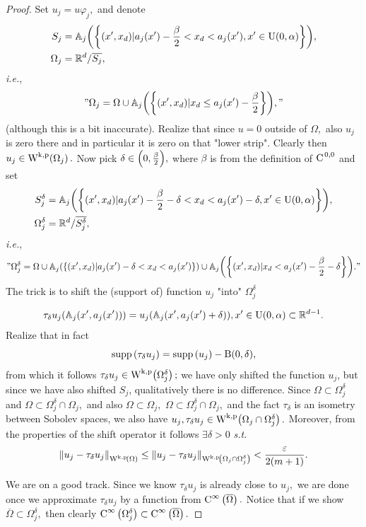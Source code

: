 \documentclass{article}
\begin{document}
\begin{proof}
	Set $u_j = u \varphi_j,$ and denote
	\begin{align*}
		S_j &=\mathbb{A}_j\qty(\qty{(x',x_d) | a_j(x') - \frac{\beta}{2}  < x_d < a_j(x') , x' \in \text{U}(0,\alpha)}), \\
	\Omega_j &= {\mathbb R}^{d} / \overline{S_j},
	\end{align*}
	\textit{i.e.},
	\[
		"\Omega_j = \Omega \cup \mathbb{A}_j\qty(\qty{(x',x_d)| x_d \leq a_j(x')- \frac{\beta}{2}}),"
	\]
	(although this is a bit inaccurate). Realize that since $u = 0$ outside of $\Omega,$ also $u_j$ is zero there and in particular it is zero on that "lower strip". Clearly then $u_j \in \WkpSet{\Omega_j}.$ Now pick $\delta \in \qty(0,\frac{\beta}{2}),$ where $\beta$ is from the definition of $\text{C}^{\!\,\, 0,0}$ and set
	\begin{align*}
	  		S_{j}^{\delta} &= \mathbb{A}_j\qty(\qty{(x',x_d) | a_j(x') - \frac{\beta}{2} - \delta < x_d < a_j(x') -\delta, x' \in \text{U}(0,\alpha)}), \\
		\Omega_j^{\delta} &= {\mathbb R}^{d} / \overline{S_{j}^{\delta}}, 
	\end{align*}
	\textit{i.e.},
	\[
		"\Omega_j^\delta = \Omega \cup \mathbb{A}_j\qty(\qty{(x',x_d)| a_j(x')-\delta < x_d < a_j (x')}) \cup \mathbb{A}_j \qty(\qty{(x',x_d)| x_d < a_j(x') - \frac{\beta}{2} - \delta})."
	\]
The trick is to shift the (support of) function $u_j$ "into" $\Omega_{j}^\delta$

	\[
		\tau_{\delta}u_j\qty(\mathbb{A}_j\qty(x', a_j(x'))) = u_j\qty(\mathbb{A}_j\qty(x', a_j(x') + \delta)), x' \in \text{U}(0,\alpha) \subset {\mathbb R}^{d-1}.
	\]
	Realize that in fact
	\[
		\operatorname{supp}\qty(\tau_{\delta}u_j) = \operatorname{supp}\qty(u_j) - \text{B}(0,\delta),
	\]
	from which it follows $\tau_{\delta}u_j \in \WkpSet{\Omega_j^{\delta}};$ we have only shifted the function $u_j$, but since we have also shifted $S_j$, qualitatively there is no difference. Since $\Omega \subset \Omega_j^\delta$ and $\Omega \subset \Omega_j^{\delta} \cap \Omega_j,$ and also $ \Omega \subset \Omega_j,$ $\Omega \subset \Omega_j^{\delta} \cap \Omega_j,$ and the fact $\tau_{\delta}$ is an isometry between Sobolev spaces, we also have $u_j, \tau_{\delta}u_j \in \WkpSet{\Omega_{j} \cap \Omega_j^{\delta}}.$ Moreover, from the properties of the shift operator it follows $\exists \delta >0$ \textit{s.t.}
	\[
		\norm{u_j - \tau_{\delta}u_j}_{\WkpSet{\Omega}}\leq \norm{u_j - \tau_{\delta}u_j}_{\WkpSet{\Omega_j \cap \Omega_j^{\delta}}} < \frac{\varepsilon}{2\qty(m+1)}.
	\]

	We are on a good track. Since we know $\tau_{\delta}u_j$ is already close to $u_j,$ we are done once we approximate $\tau_{\delta}u_j$ by a function from $\text{C}^{\infty}\!\,\left(\overline{\Omega} \right).$ Notice that if we show $\overline{\Omega} \subset \Omega_j^{\delta},$ then clearly $\text{C}^{\infty}\!\,\left(\Omega_j^{\delta} \right) \subset \text{C}^{\infty}\!\,\left(\overline{\Omega} \right).$


\end{proof}
\end{document}
